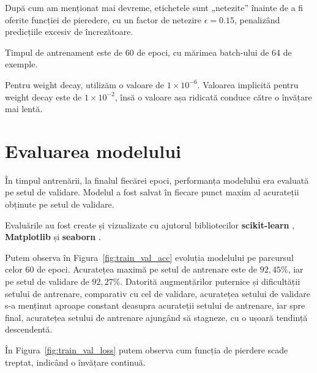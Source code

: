După cum am menționat mai devreme, etichetele sunt „netezite” înainte de a fi oferite funcției de pieredere, cu un factor de netezire $\epsilon = 0.15$, penalizând predicțiile excesiv de încrezătoare.

Timpul de antrenament este de 60 de epoci, cu mărimea batch-ului de 64 de exemple.

Pentru weight decay, utilizăm o valoare de $1 \times 10^{-6}$. Valoarea implicită pentru weight decay este de $1\times10^{-2}$, însă o valoare așa ridicată conduce către o învățare mai lentă.

\section{Evaluarea modelului}

În timpul antrenării, la finalul fiecărei epoci, performanța modelului era evaluată pe setul de validare. Modelul a fost salvat în fiecare punct maxim al acurateții obținute pe setul de validare.

Evaluările au fost create și vizualizate cu ajutorul bibliotecilor \textbf{scikit-learn} \cite{scikit-learn}, \textbf{Matplotlib} \cite{matplotlib} și \textbf{seaborn} \cite{seaborn}.

Putem observa în Figura~\ref{fig:train_val_acc}
evoluția modelului pe parcursul celor 60 de epoci. Acuratețea maximă pe setul de antrenare este de $92,45\%$, iar pe setul de validare de $92,27\%$. Datorită augmentărilor puternice și dificultății setului de antrenare, comparativ cu cel de validare, acuratețea setului de validare s-a menținut aproape constant deasupra acurateții setului de antrenare, iar spre final, acuratețea setului de antrenare ajungând să stagneze, cu o ușoară tendință descendentă. 

În Figura~\ref{fig:train_val_loss} putem observa cum funcția de pierdere scade treptat, indicând o învățare continuă.


